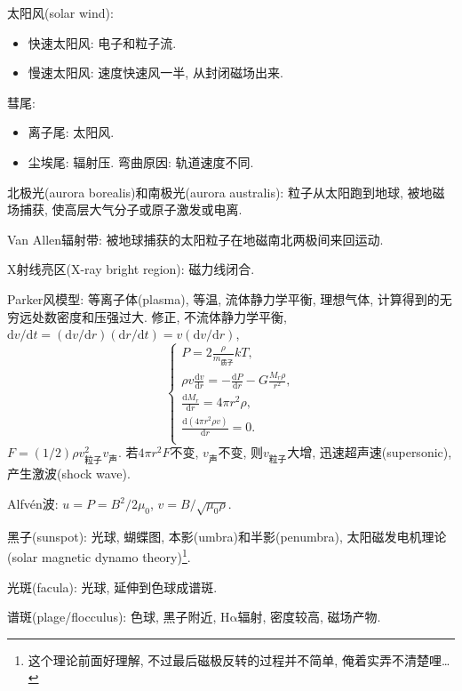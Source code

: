 太阳风(solar wind):
\begin{itemize}
    \item 快速太阳风: 电子和粒子流.
    \item 慢速太阳风: 速度快速风一半, 从封闭磁场出来.
\end{itemize}

彗尾:
\begin{itemize}
    \item 离子尾: 太阳风.
    \item 尘埃尾: 辐射压. 弯曲原因: 轨道速度不同.
\end{itemize}

北极光(aurora borealis)和南极光(aurora australis): 粒子从太阳跑到地球, 被地磁场捕获, 使高层大气分子或原子激发或电离.

Van Allen辐射带: 被地球捕获的太阳粒子在地磁南北两极间来回运动.

X射线亮区(X-ray bright region): 磁力线闭合.

Parker风模型: 等离子体(plasma), 等温, 流体静力学平衡, 理想气体, 计算得到的无穷远处数密度和压强过大. 修正, 不流体静力学平衡, $\mathrm{d}v/\mathrm{d}t=(\mathrm{d}v/\mathrm{d}r)(\mathrm{d}r/\mathrm{d}t)=v(\mathrm{d}v/\mathrm{d}r)$,
\begin{equation*}
    \begin{cases}
        P = 2\frac{\rho}{m_\text{质子}}kT, \\
        \rho v \frac{\mathrm{d}v}{\mathrm{d}r}=-\frac{\mathrm{d}P}{\mathrm{d}r}-G\frac{M_r\rho}{r^2}, \\
        \frac{\mathrm{d}M_r}{\mathrm{d}r}=4\pi r^2\rho, \\
        \frac{\mathrm{d}(4\pi r^2\rho v)}{\mathrm{d}r}=0. \\
    \end{cases}
\end{equation*}
$F=(1/2)\rho v_\text{粒子}^2v_\text{声}$. 若$4\pi r^2F$不变, $v_\text{声}$不变, 则$v_\text{粒子}$大增, 迅速超声速(supersonic), 产生激波(shock wave).

Alfv\'en波: $u=P=B^2/2\mu_0$, $v=B/\sqrt{\mu_0\rho}$.

黑子(sunspot): 光球, 蝴蝶图, 本影(umbra)和半影(penumbra), 太阳磁发电机理论(solar magnetic dynamo theory)\footnote{这个理论前面好理解, 不过最后磁极反转的过程并不简单, 俺着实弄不清楚哩\dots}.

光斑(facula): 光球, 延伸到色球成谱斑.

谱斑(plage/flocculus): 色球, 黑子附近, H$\mathrm{\alpha}$辐射, 密度较高, 磁场产物.

